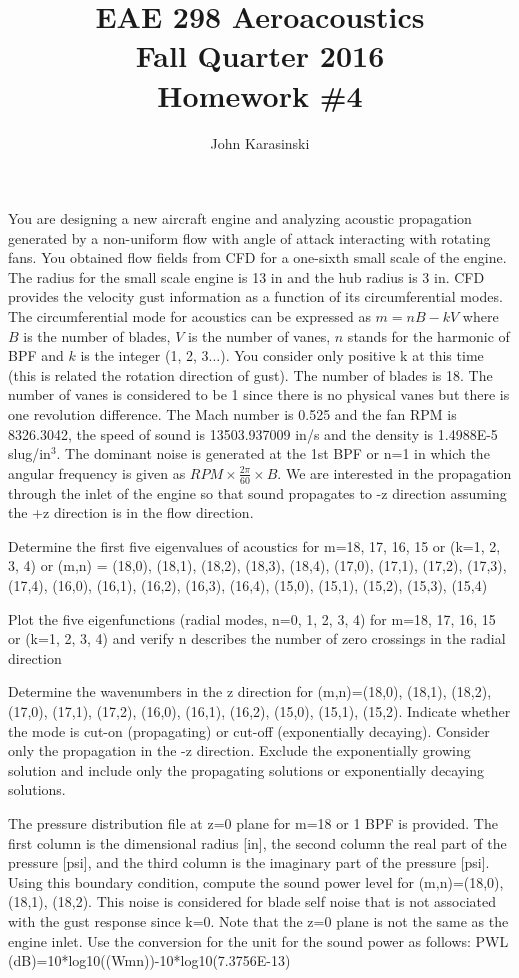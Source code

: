\documentclass[onecolumn,10pt]{jhwhw}
\author{John Karasinski}
\title{EAE 298 Aeroacoustics \\ Fall Quarter 2016 \\ Homework \#4}
\begin{document}
\maketitle

You are designing a new aircraft engine and analyzing acoustic propagation generated by a non-uniform flow with angle of attack interacting with rotating fans. You obtained flow fields from CFD for a one-sixth small scale of the engine. The radius for the small scale engine is 13 in and the hub radius is 3 in. CFD provides the velocity gust information as a function of its circumferential modes. The circumferential mode for acoustics can be expressed as $m= nB - kV$ where $B$ is the number of blades, $V$ is the number of vanes, $n$ stands for the harmonic of BPF and $k$ is the integer (1, 2, 3$\ldots$). You consider only positive k at this time (this is related the rotation direction of gust). The number of blades is 18. The number of vanes is considered to be 1 since there is no physical vanes but there is one revolution difference. The Mach number is 0.525 and the fan RPM is 8326.3042, the speed of sound is 13503.937009 in/s and the density is 1.4988E-5 slug/in$^3$. The dominant noise is generated at the 1st BPF or n=1 in which the angular frequency is given as $RPM \times \frac{2 \pi}{60} \times B$. We are interested in the propagation through the inlet of the engine so that sound propagates to -z direction assuming the +z direction is in the flow direction.

\problem{[20 points]}
Determine the first five eigenvalues of acoustics for m=18, 17, 16, 15 or (k=1, 2, 3, 4) or (m,n) = (18,0), (18,1), (18,2), (18,3), (18,4), (17,0), (17,1), (17,2), (17,3), (17,4), (16,0), (16,1), (16,2), (16,3), (16,4), (15,0), (15,1), (15,2), (15,3), (15,4)

\problem{[20 points]}
Plot the five eigenfunctions (radial modes, n=0, 1, 2, 3, 4) for m=18, 17, 16, 15 or (k=1, 2, 3, 4) and verify n describes the number of zero crossings in the radial direction

\problem{[20 points]}
Determine the wavenumbers in the z direction for (m,n)=(18,0), (18,1), (18,2), (17,0), (17,1), (17,2), (16,0), (16,1), (16,2), (15,0), (15,1), (15,2). Indicate whether the mode is cut-on (propagating) or cut-off (exponentially decaying). Consider only the propagation in the -z direction. Exclude the exponentially growing solution and include only the propagating solutions or exponentially decaying solutions.

\problem{[30 points]}
The pressure distribution file at z=0 plane for m=18 or 1 BPF is provided. The first column is the dimensional radius [in], the second column the real part of the pressure [psi], and the third column is the imaginary part of the pressure [psi]. Using this boundary condition, compute the sound power level for (m,n)=(18,0), (18,1), (18,2). This noise is considered for blade self noise that is not associated with the gust response since k=0. Note that the z=0 plane is not the same as the engine inlet. Use the conversion for the unit for the sound power as follows: PWL (dB)=10*log10((Wmn))-10*log10(7.3756E-13)
\end{document}
